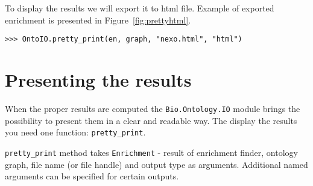 To display the results we will export it to html file. Example of exported
enrichment is presented in Figure~\ref{fig:prettyhtml}.
\begin{verbatim}
>>> OntoIO.pretty_print(en, graph, "nexo.html", "html")
\end{verbatim}

\section{Presenting the results}
When the proper results are computed the \verb|Bio.Ontology.IO| module brings
the possibility to present them in a clear and readable way. The display the
results you need one function: \verb|pretty_print|.

\verb|pretty_print| method takes \verb|Enrichment| - result of enrichment finder, ontology graph,
file name (or file handle) and output type as arguments. Additional named
arguments can be specified for certain outputs.
